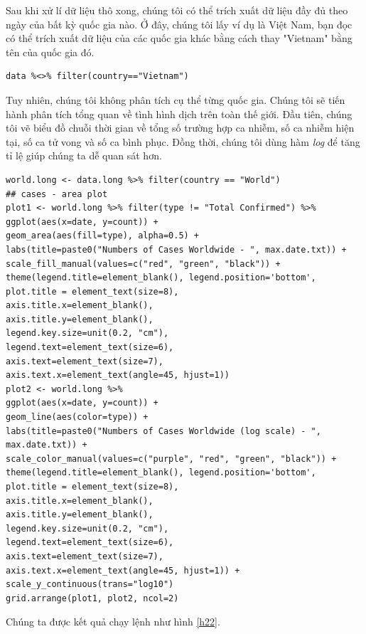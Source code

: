 \documentclass[12pt, a4paper,oneside]{book}
\theoremstyle{definition}
\begin{document}
Sau khi xử lí dữ liệu thô xong, chúng tôi có thể trích xuất dữ liệu đầy đủ theo ngày của bất kỳ quốc gia nào. Ở đây, chúng tôi lấy ví dụ là Việt Nam, bạn đọc có thể trích xuất dữ liệu của các quốc gia khác bằng cách thay "Vietnam" bằng tên của quốc gia đó.
\begin{lstlisting}
data %<>% filter(country=="Vietnam")
\end{lstlisting}
Tuy nhiên, chúng tôi không phân tích cụ thể từng quốc gia. Chúng tôi sẽ tiến hành phân tích tổng quan về tình hình dịch trên toàn thế giới. Đầu tiên, chúng tôi vẽ biểu đồ chuỗi thời gian về tổng số trường hợp ca nhiễm, số ca nhiễm hiện tại, số ca tử vong và số ca bình phục. Đồng thời, chúng tôi dùng hàm \textit{log} để tăng tỉ lệ giúp chúng ta dễ quan sát hơn. 
\begin{lstlisting}
world.long <- data.long %>% filter(country == "World")
## cases - area plot
plot1 <- world.long %>% filter(type != "Total Confirmed") %>%
ggplot(aes(x=date, y=count)) +
geom_area(aes(fill=type), alpha=0.5) +
labs(title=paste0("Numbers of Cases Worldwide - ", max.date.txt)) +
scale_fill_manual(values=c("red", "green", "black")) +
theme(legend.title=element_blank(), legend.position='bottom',
plot.title = element_text(size=8),
axis.title.x=element_blank(),
axis.title.y=element_blank(),
legend.key.size=unit(0.2, "cm"),
legend.text=element_text(size=6),
axis.text=element_text(size=7),
axis.text.x=element_text(angle=45, hjust=1))
plot2 <- world.long %>%
ggplot(aes(x=date, y=count)) +
geom_line(aes(color=type)) +
labs(title=paste0("Numbers of Cases Worldwide (log scale) - ", max.date.txt)) +
scale_color_manual(values=c("purple", "red", "green", "black")) +
theme(legend.title=element_blank(), legend.position='bottom',
plot.title = element_text(size=8),
axis.title.x=element_blank(),
axis.title.y=element_blank(),
legend.key.size=unit(0.2, "cm"),
legend.text=element_text(size=6),
axis.text=element_text(size=7),
axis.text.x=element_text(angle=45, hjust=1)) +
scale_y_continuous(trans="log10")
grid.arrange(plot1, plot2, ncol=2)
\end{lstlisting}
Chúng ta được kết quả chạy lệnh như hình \ref{h22}.
\end{document}
